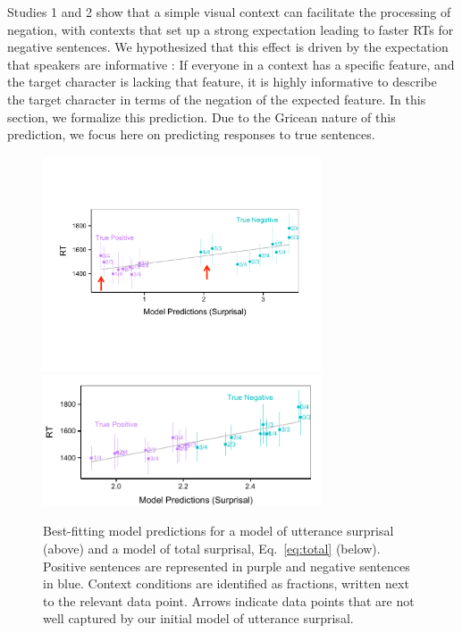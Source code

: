 \documentclass[10pt,letterpaper]{article}
\begin{document}
Studies 1 and 2 show that a simple visual context can facilitate the processing of negation, with contexts that set up a strong expectation leading to faster RTs for negative sentences.  We hypothesized that this effect is driven by the expectation that speakers are informative \cite{grice1975,frank2012}: If everyone in a context has a specific feature, and the target character is lacking that feature, it is highly informative to describe the target character in terms of the negation of the expected feature. In this section, we formalize this prediction. Due to the Gricean nature of this prediction, we focus here on predicting responses to true sentences.   


\begin{figure}[t]
\begin{center} 
\includegraphics[width=3.25in]{figures/model1_comparison.pdf}
\includegraphics[width=3.25in]{figures/model2_comparison.pdf}
\caption{\label{fig:model1_sims} Best-fitting model predictions for a model of utterance surprisal (above) and a model of total surprisal, Eq.\ \ref{eq:total} (below).  Positive sentences are represented in purple and negative sentences in blue.  Context conditions are identified as fractions, written next to the relevant data point.  Arrows indicate data points that are not well captured by our initial model of utterance surprisal.}
\end{center} 
\end{figure}
\end{document}

